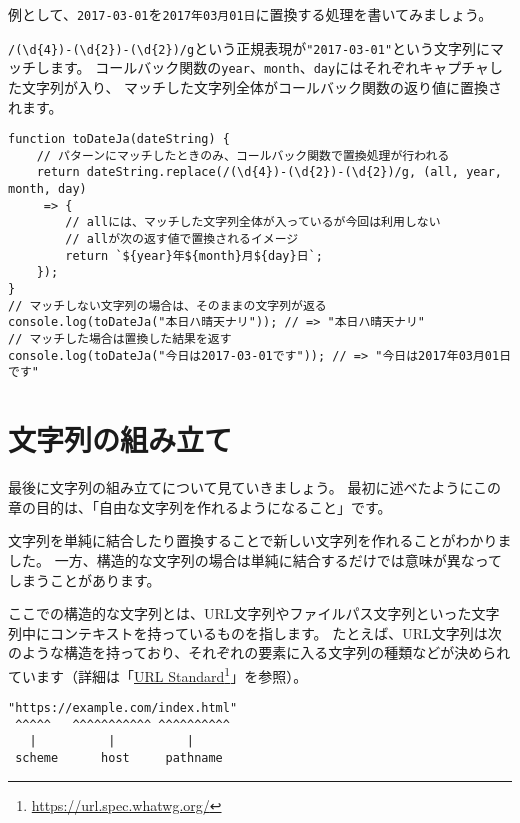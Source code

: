 例として、\texttt{2017-03-01}を\texttt{2017年03月01日}に置換する処理を書いてみましょう。

\texttt{/(\textbackslash d\{4\})-(\textbackslash d\{2\})-(\textbackslash d\{2\})/g}という正規表現が\texttt{"2017-03-01"}という文字列にマッチします。
コールバック関数の\texttt{year}、\texttt{month}、\texttt{day}にはそれぞれキャプチャした文字列が入り、
マッチした文字列全体がコールバック関数の返り値に置換されます。

\begin{lstlisting}
function toDateJa(dateString) {
    // パターンにマッチしたときのみ、コールバック関数で置換処理が行われる
    return dateString.replace(/(\d{4})-(\d{2})-(\d{2})/g, (all, year, month, day)
     => {
        // allには、マッチした文字列全体が入っているが今回は利用しない
        // allが次の返す値で置換されるイメージ
        return `${year}年${month}月${day}日`;
    });
}
// マッチしない文字列の場合は、そのままの文字列が返る
console.log(toDateJa("本日ハ晴天ナリ")); // => "本日ハ晴天ナリ"
// マッチした場合は置換した結果を返す
console.log(toDateJa("今日は2017-03-01です")); // => "今日は2017年03月01日です"
\end{lstlisting}

\hypertarget{built}{%
\section{文字列の組み立て}\label{built}}

最後に文字列の組み立てについて見ていきましょう。
最初に述べたようにこの章の目的は、「自由な文字列を作れるようになること」です。

文字列を単純に結合したり置換することで新しい文字列を作れることがわかりました。
一方、構造的な文字列の場合は単純に結合するだけでは意味が異なってしまうことがあります。

ここでの構造的な文字列とは、URL文字列やファイルパス文字列といった文字列中にコンテキストを持っているものを指します。
たとえば、URL文字列は次のような構造を持っており、それぞれの要素に入る文字列の種類などが決められています（詳細は「\href{https://url.spec.whatwg.org/}{URL
Standard}\footnote{\url{https://url.spec.whatwg.org/}}」を参照）。

\begin{lstlisting}
"https://example.com/index.html"
 ^^^^^   ^^^^^^^^^^^ ^^^^^^^^^^
   |          |     　　　|
 scheme      host     pathname
\end{lstlisting}

